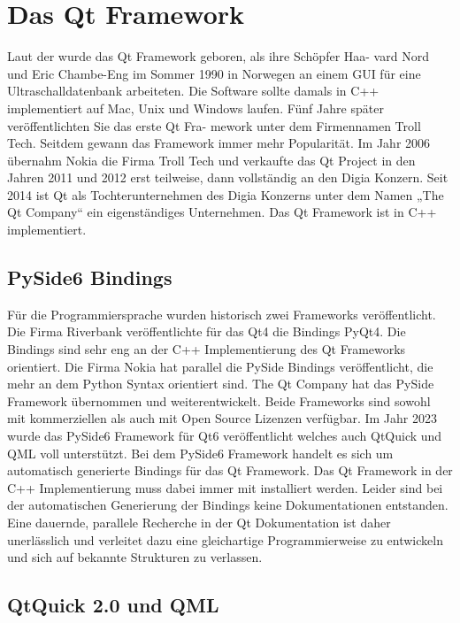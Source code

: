 \section{Das Qt Framework}

Laut der \cite[Qt Wiki Website]{qtWikiHistory} wurde das Qt Framework geboren, als ihre Schöpfer Haa-
vard Nord und Eric Chambe-Eng im Sommer 1990 in Norwegen an einem GUI für eine
Ultraschalldatenbank arbeiteten. Die Software sollte damals in C++ implementiert auf
Mac, Unix und Windows laufen. Fünf Jahre später veröffentlichten Sie das erste Qt Fra-
mework unter dem Firmennamen Troll Tech. Seitdem gewann das Framework immer
mehr Popularität. Im Jahr 2006 übernahm Nokia die Firma Troll Tech und verkaufte das
Qt Project in den Jahren 2011 und 2012 erst teilweise, dann vollständig an den Digia
Konzern. Seit 2014 ist Qt als Tochterunternehmen des Digia Konzerns unter dem Namen
„The Qt Company“ ein eigenständiges Unternehmen.
Das Qt Framework ist in C++ implementiert.

\subsection{PySide6 Bindings}

Für die Programmiersprache wurden historisch zwei Frameworks veröffentlicht. Die Firma Riverbank veröffentlichte für das Qt4 die Bindings PyQt4.
Die Bindings sind sehr eng an der C++ Implementierung des Qt Frameworks orientiert.
Die Firma Nokia hat parallel die PySide Bindings veröffentlicht, die mehr an dem Python Syntax orientiert sind.
The Qt Company hat das PySide Framework übernommen und weiterentwickelt. 
Beide Frameworks sind sowohl mit kommerziellen als auch mit Open Source Lizenzen verfügbar.
Im Jahr 2023 wurde das PySide6 Framework für Qt6 veröffentlicht welches auch QtQuick und QML voll unterstützt. 
Bei dem PySide6 Framework handelt es sich um automatisch generierte Bindings für das Qt Framework. 
Das Qt Framework in der C++ Implementierung muss dabei immer mit installiert werden. 
Leider sind bei der automatischen Generierung der Bindings keine Dokumentationen entstanden.
Eine dauernde, parallele Recherche in der Qt Dokumentation ist daher unerlässlich und verleitet dazu eine gleichartige
Programmierweise zu entwickeln und sich auf bekannte Strukturen zu verlassen.

\subsection{QtQuick 2.0 und QML}

